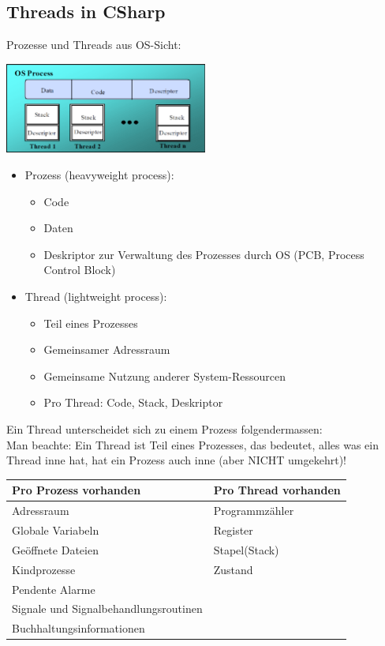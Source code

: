 \subsection{Threads in CSharp }
Prozesse und Threads aus OS-Sicht:\\
\begin{center}
{\includegraphics[width=0.5\textwidth]{images/Concurrency/ProzesseUndThreads.png}}
\end{center}
\begin{itemize}
  \item Prozess (heavyweight process):
  \begin{itemize}
    \item Code
    \item Daten
    \item Deskriptor zur Verwaltung des Prozesses durch OS (PCB, Process
    Control Block)
  \end{itemize}
  \item Thread (lightweight process):
  \begin{itemize}
    \item Teil eines Prozesses
    \item Gemeinsamer Adressraum
    \item Gemeinsame Nutzung anderer System-Ressourcen
    \item Pro Thread: Code, Stack, Deskriptor
  \end{itemize}
\end{itemize}
Ein Thread unterscheidet sich zu einem Prozess folgendermassen:\\
Man beachte: Ein Thread ist Teil eines Prozesses, das bedeutet, alles was ein
Thread inne hat, hat ein Prozess auch inne (aber NICHT umgekehrt)!\\
\begin{centering}
  \begin{tabular}{l | l}
    \hline
    \hline
    Pro Prozess vorhanden & Pro Thread vorhanden\\
    \hline
    \hline
    Adressraum & Programmzähler\\
    \hline
    Globale Variabeln & Register\\
    \hline
    Geöffnete Dateien & Stapel(Stack)\\ 
    \hline
    Kindprozesse & Zustand\\
    \hline 
    Pendente Alarme & \\
    \hline 
    Signale und Signalbehandlungsroutinen &\\
    \hline
    Buchhaltungsinformationen
  \end{tabular}
\end{centering}\\

